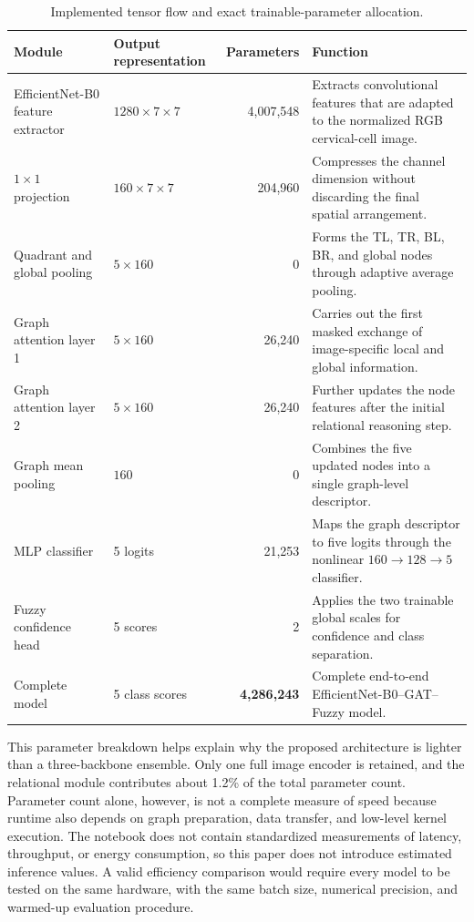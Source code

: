 \documentclass[10pt,conference]{IEEEtran}
\begin{document}
\begin{table}[!t]
\caption{Implemented tensor flow and exact trainable-parameter allocation.}
\label{tab:modelprofile}
\centering
\footnotesize
\setlength{\tabcolsep}{4pt}
\begin{tabular}{p{3.2cm}p{3.0cm}rp{7.0cm}}
\toprule
Module & Output representation & Parameters & Function\\
\midrule
EfficientNet-B0 feature extractor & $1280\times7\times7$ & 4,007,548 & Extracts convolutional features that are adapted to the normalized RGB cervical-cell image.\\
$1\times1$ projection & $160\times7\times7$ & 204,960 & Compresses the channel dimension without discarding the final spatial arrangement.\\
Quadrant and global pooling & $5\times160$ & 0 & Forms the TL, TR, BL, BR, and global nodes through adaptive average pooling.\\
Graph attention layer 1 & $5\times160$ & 26,240 & Carries out the first masked exchange of image-specific local and global information.\\
Graph attention layer 2 & $5\times160$ & 26,240 & Further updates the node features after the initial relational reasoning step.\\
Graph mean pooling & $160$ & 0 & Combines the five updated nodes into a single graph-level descriptor.\\
MLP classifier & 5 logits & 21,253 & Maps the graph descriptor to five logits through the nonlinear $160\rightarrow128\rightarrow5$ classifier.\\
Fuzzy confidence head & 5 scores & 2 & Applies the two trainable global scales for confidence and class separation.\\
\midrule
Complete model & 5 class scores & \textbf{4,286,243} & Complete end-to-end EfficientNet-B0--GAT--Fuzzy model.\\
\bottomrule
\end{tabular}
\end{table}

This parameter breakdown helps explain why the proposed architecture is lighter than a three-backbone ensemble. Only one full image encoder is retained, and the relational module contributes about 1.2\% of the total parameter count. Parameter count alone, however, is not a complete measure of speed because runtime also depends on graph preparation, data transfer, and low-level kernel execution. The notebook does not contain standardized measurements of latency, throughput, or energy consumption, so this paper does not introduce estimated inference values. A valid efficiency comparison would require every model to be tested on the same hardware, with the same batch size, numerical precision, and warmed-up evaluation procedure.
\end{document}
